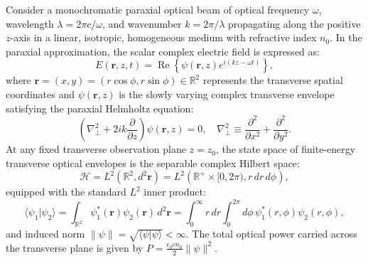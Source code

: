 \documentclass{optica-article}
\begin{document}
Consider a monochromatic paraxial optical beam of optical frequency $\omega$, wavelength $\lambda = 2\pi c / \omega$, and wavenumber $k = 2\pi / \lambda$ propagating along the positive $z$-axis in a linear, isotropic, homogeneous medium with refractive index $n_0$. In the paraxial approximation, the scalar complex electric field is expressed as:
\begin{equation}
E(\mathbf{r}, z, t) = \operatorname{Re}\left\{ \psi(\mathbf{r}, z) e^{i(k z - \omega t)} \right\},
\label{eq:paraxial_field_rep}
\end{equation}
where $\mathbf{r} = (x, y) = (r\cos\phi, r\sin\phi) \in \mathbb{R}^2$ represents the transverse spatial coordinates and $\psi(\mathbf{r}, z)$ is the slowly varying complex transverse envelope satisfying the paraxial Helmholtz equation:
\begin{equation}
\left( \nabla_\perp^2 + 2 i k \frac{\partial}{\partial z} \right) \psi(\mathbf{r}, z) = 0, \quad \nabla_\perp^2 \equiv \frac{\partial^2}{\partial x^2} + \frac{\partial^2}{\partial y^2}.
\label{eq:paraxial_helmholtz}
\end{equation}
At any fixed transverse observation plane $z = z_0$, the state space of finite-energy transverse optical envelopes is the separable complex Hilbert space:
\begin{equation}
\mathcal{H} = L^2(\mathbb{R}^2, d^2\mathbf{r}) = L^2\left(\mathbb{R}^+ \times [0, 2\pi), r \, dr \, d\phi\right),
\label{eq:hilbert_space_def}
\end{equation}
equipped with the standard $L^2$ inner product:
\begin{equation}
\langle \psi_1 | \psi_2 \rangle = \int_{\mathbb{R}^2} \psi_1^*(\mathbf{r}) \psi_2(\mathbf{r}) \, d^2\mathbf{r} = \int_0^\infty r \, dr \int_0^{2\pi} d\phi \, \psi_1^*(r, \phi) \psi_2(r, \phi),
\label{eq:inner_product_def}
\end{equation}
and induced norm $\|\psi\| = \sqrt{\langle \psi | \psi \rangle} < \infty$. The total optical power carried across the transverse plane is given by $P = \frac{\epsilon_0 c n_0}{2} \|\psi\|^2$.
\end{document}

